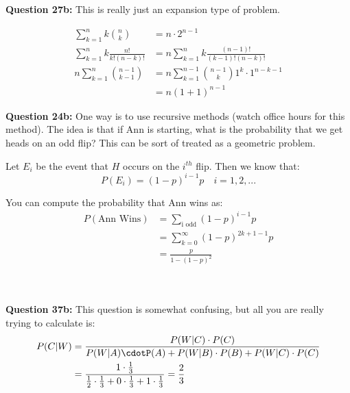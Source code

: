 \documentclass{article}
\begin{document}
    \\~\\
    
    \noindent \textbf{Question 27b:} This is really just an expansion type of problem.
    
    \begin{equation*}
    \begin{split}
        \sum \limits_{k=1}^n k {n\choose k} &= n \cdot  2^{n-1}\\
        \sum \limits_{k=1}^n k \frac{n!}{k!(n-k)!} &= n \sum \limits_{k=1}^n k \frac{(n-1)!}{(k-1)!(n-k)!}\\
        n \sum \limits_{k=1}^n {{n-1}\choose{k-1}} &= n \sum \limits_{k=1}^{n-1} {{n-1}\choose{k}} 1^k \cdot 1^{n-k-1}\\
        &= n(1+1)^{n-1}
    \end{split}
    \end{equation*}

\noindent \textbf{Question 24b:} One way is to use recursive methods (watch office hours for this method). The idea is that if Ann is starting, what is the probability that we get heads on an odd flip? This can be sort of treated as a geometric problem.

Let $E_i$ be the event that $H$ occurs on the $i^{th}$ flip. Then we know that:
\begin{equation*}
    P(E_i) = (1-p)^{i-1}p \quad i = 1,2,...
\end{equation*}

You can compute the probability that Ann wins as:
\begin{equation*}
\begin{split}
    P(\text{Ann Wins}) &= \sum\limits_{\text{i odd}} (1-p)^{i-1}p\\
        &= \sum\limits_{k=0}^\infty (1-p)^{2k+1-1}p\\
        &= \frac{p}{1-(1-p)^2}
\end{split}
\end{equation*}

\\~\\

\noindent \textbf{Question 37b:} This question is somewhat confusing, but all you are really trying to calculate is: 
\begin{equation*}
\begin{split}
    P(C|W) &= \frac{P(W|C) \cdot P(C)}{P(W|A)\cdotP(A) + P(W|B)\cdot P(B) + P(W|C)\cdot P(C)}\\
        &= \frac{1 \cdot \frac{1}{3}}{\frac{1}{2}\cdot\frac{1}{3} + 0 \cdot \frac{1}{3} + 1 \cdot \frac{1}{3} } = \frac{2}{3}
\end{split}
\end{equation*}
\end{document}
